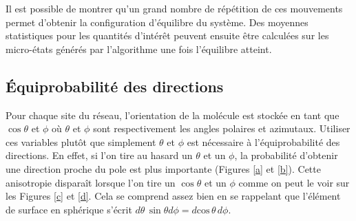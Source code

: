 \documentclass[11pt,a4paper]{article}
\numberwithin{equation}{section}
\begin{document}
Il est possible de montrer qu'un grand nombre de répétition de ces mouvements permet d'obtenir la configuration d'équilibre du système. Des moyennes statistiques pour les quantités d'intérêt peuvent ensuite être calculées sur les micro-états générés par l'algorithme une fois l'équilibre atteint.

\subsection{Équiprobabilité des directions}
Pour chaque site du réseau, l'orientation de la molécule est stockée en tant que $\cos \theta$ et $\phi$ où $\theta$ et $\phi$ sont respectivement les angles polaires et azimutaux. Utiliser ces variables plutôt que simplement $\theta$ et $\phi$ est nécessaire à l'équiprobabilité des directions. En effet, si l'on tire au hasard un $\theta$ et un $\phi$, la probabilité d'obtenir une direction proche du pole est plus importante (Figures \ref{a} et \ref{b}). Cette anisotropie disparaît lorsque l'on tire un $\cos \theta$ et un $\phi$ comme on peut le voir sur les Figures \ref{c} et \ref{d}. Cela se comprend assez bien en se rappelant que l'élément de surface en sphérique s'écrit $d\theta\, \sin \theta d\phi = d\text{cos}\,\theta\, d\phi$.
\end{document}
